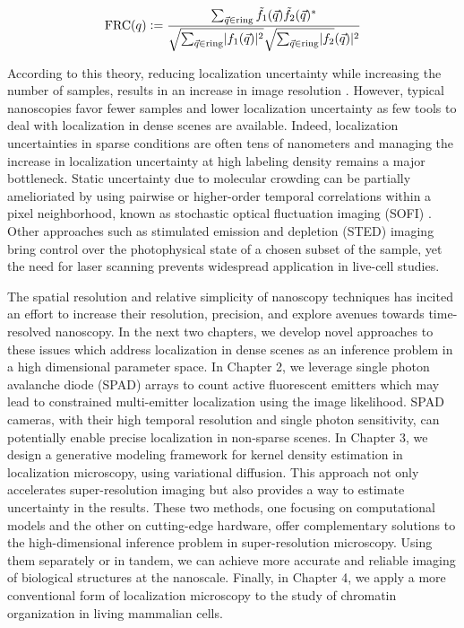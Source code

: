 \begin{equation}
\mathrm{FRC}(q) \vcentcolon = \frac{\sum_{\vec{q}\in\mathrm{ring}}\tilde{f_{1}}(\vec{q})\tilde{f_{2}}(\vec{q})^{*}}{\sqrt{\sum_{\vec{q}\in\mathrm{ring}}\lvert f_{1}(\vec{q})\lvert^{2}}\sqrt{\sum_{\vec{q}\in\mathrm{ring}}\lvert f_{2}}(\vec{q})\lvert^{2}}
\end{equation}

According to this theory, reducing localization uncertainty while increasing the number of samples, results in an increase in image resolution \parencite{Nieuwenhuizen2013}. However, typical nanoscopies favor fewer samples and lower localization uncertainty as few tools to deal with localization in dense scenes are available. Indeed, localization uncertainties in sparse conditions are often tens of nanometers and managing the increase in localization uncertainty at high labeling density remains a major bottleneck. Static uncertainty due to molecular crowding can be partially amelioriated by using pairwise or higher-order temporal correlations within a pixel neighborhood, known as stochastic optical fluctuation imaging (SOFI) \parencite{Dertinger2009}. Other approaches such as stimulated emission and depletion (STED) imaging bring control over the photophysical state of a chosen subset of the sample, yet the need for laser scanning prevents widespread application in live-cell studies. 

The spatial resolution and relative simplicity of nanoscopy techniques has incited an effort to increase their resolution, precision, and explore avenues towards time-resolved nanoscopy. In the next two chapters, we develop novel approaches to these issues which address localization in dense scenes as an inference problem in a high dimensional parameter space. In Chapter 2,  we leverage single photon avalanche diode (SPAD) arrays to count active fluorescent emitters which may lead to constrained multi-emitter localization using the image likelihood. SPAD cameras, with their high temporal resolution and single photon sensitivity, can potentially enable precise localization in non-sparse scenes. In Chapter 3, we design a generative modeling framework for kernel density estimation in localization microscopy, using variational diffusion. This approach not only accelerates super-resolution imaging but also provides a way to estimate uncertainty in the results. These two methods, one focusing on computational models and the other on cutting-edge hardware, offer complementary solutions to the high-dimensional inference problem in super-resolution microscopy. Using them separately or in tandem, we can achieve more accurate and reliable imaging of biological structures at the nanoscale. Finally, in Chapter 4, we apply a more conventional form of localization microscopy to the study of chromatin organization in living mammalian cells. 

